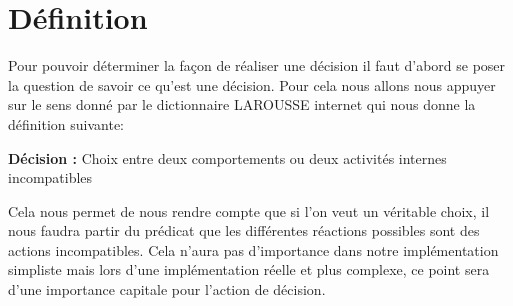 \section{Définition}

Pour pouvoir déterminer la façon de réaliser une décision il faut d'abord se
poser la question de savoir ce qu'est une décision. Pour cela nous allons nous
appuyer sur le sens donné par le dictionnaire LAROUSSE internet qui nous donne
la définition suivante:

\begin{center}
  {\bfseries Décision :} Choix entre deux comportements ou deux activités
  internes incompatibles
\end{center}

Cela nous permet de nous rendre compte que si l'on veut un véritable choix, il
nous faudra partir du prédicat que les différentes réactions possibles sont des
actions incompatibles. Cela n'aura pas d'importance dans notre implémentation
simpliste mais lors d'une implémentation réelle et plus complexe, ce point sera
d'une importance capitale pour l'action de décision.
